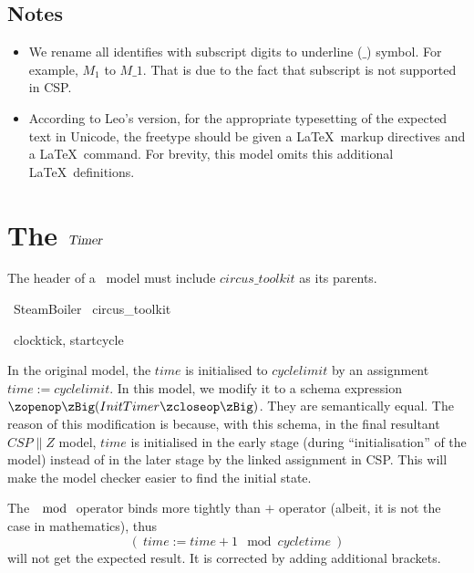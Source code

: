 \documentclass{report} %
\begin{document}
\section{Notes}
\begin{itemize}
    \item We rename all identifies with subscript digits to underline ($\_$) symbol. For example, $M_1$ to $M\_1$. That is due to the fact that subscript is not supported in CSP.
    \item According to Leo's version, for the appropriate typesetting of the expected text in Unicode, the freetype should be given a \LaTeX\ markup directives and a \LaTeX\ command. For brevity, this model omits this additional \LaTeX\ definitions.
\end{itemize}

\chapter{The $\mathsl{Timer}$}

The header of a \Circus\ model must include $circus\_toolkit$ as its parents.
\begin{zsection}
	\SECTION\ SteamBoiler \parents\ circus\_toolkit
\end{zsection}

\begin{circus}
    \circchannel\ clocktick, startcycle
\end{circus}

In the original model, the $time$ is initialised to $cyclelimit$ by an assignment $time := cyclelimit$. In this model, we modify it to a schema expression $\lschexpract InitTimer \rschexpract$. They are semantically equal. The reason of this modification is because, with this schema, in the final resultant $CSP \parallel Z$ model, $time$ is initialised in the early stage (during ``initialisation'' of the model) instead of in the later stage by the linked assignment in CSP. This will make the model checker easier to find the initial state.

The $\mod$ operator binds more tightly than $+$ operator (albeit, it is not the case in mathematics), thus
\[(~time := time + 1 \mod cycletime ~)\]
will not get the expected result. It is corrected by adding additional brackets.
\end{document}
